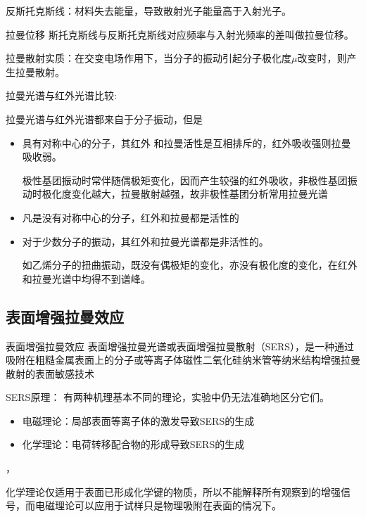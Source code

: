 反斯托克斯线：材料失去能量，导致散射光子能量高于入射光子。
\begin{definition*}{拉曼位移}
    斯托克斯线与反斯托克斯线对应频率与入射光频率的差叫做拉曼位移。
\end{definition*}

拉曼散射实质：在交变电场作用下，当分子的振动引起分子极化度$\mu$改变时，则产生拉曼散射。

\begin{note}
    拉曼光谱与红外光谱比较:

    拉曼光谱与红外光谱都来自于分子振动，但是
    \begin{itemize}
        \item 具有对称中心的分子，其红外	和拉曼活性是互相排斥的，红外吸收强则拉曼吸收弱。         \begin{example}
            极性基团振动时常伴随偶极矩变化，因而产生较强的红外吸收，非极性基团振动时极化度变化越大，拉曼散射越强，故非极性基团分析常用拉曼光谱
        \end{example}
        \item 凡是没有对称中心的分子，红外和拉曼都是活性的
        \item 对于少数分子的振动，其红外和拉曼光谱都是非活性的。
        \begin{example}
            如乙烯分子的扭曲振动，既没有偶极矩的变化，亦没有极化度的变化，在红外和拉曼光谱中均得不到谱峰。
        \end{example}
    \end{itemize}
\end{note}

\subsection{表面增强拉曼效应}
\begin{definition*}{表面增强拉曼效应}
    表面增强拉曼光谱或表面增强拉曼散射（SERS），是一种通过吸附在粗糙金属表面上的分子或等离子体磁性二氧化硅纳米管等纳米结构增强拉曼散射的表面敏感技术
\end{definition*}

SERS原理：
有两种机理基本不同的理论，实验中仍无法准确地区分它们。
\begin{itemize}
    \item 电磁理论：局部表面等离子体的激发导致SERS的生成
    \item 化学理论：电荷转移配合物的形成导致SERS的生成
\end{itemize}，
\begin{note}
    化学理论仅适用于表面已形成化学键的物质，所以不能解释所有观察到的增强信号，而电磁理论可以应用于试样只是物理吸附在表面的情况下。
\end{note}

